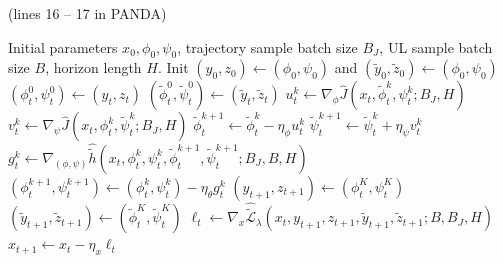 \documentclass{article}
\theoremstyle{plain}
\theoremstyle{definition}
\theoremstyle{remark}
\def\R{\mathbb R}
\def\cL{\mathcal L}
\begin{document}

 (lines 16 -- 17 in PANDA)
\begin{algorithm}[tb]
  \caption{PANDA: \underline{P}enalty-\underline{A}ugmented \underline{N}ikaido--Isoda based \underline{D}escent--\underline{A}scent}
  \label{alg: stoc-double-loop-single-large-batch-main}
  \begin{algorithmic}[1]
     Initial parameters $x_0,\phi_0,\psi_0$, trajectory sample batch size $B_{J}$, UL sample batch size $B$, horizon length $H$.
    \STATE Init $(y_0,z_0) \gets (\phi_0,\psi_0)$ and $(\tilde{y}_0,\tilde{z}_0) \gets (\phi_0,\psi_0)$ \label{line: init-policies}
        \STATE $(\phi_t^0,\psi_t^0) \gets (y_t,z_t)$ 
        \STATE $(\tilde{\phi}_t^0,\tilde{\psi}_t^0) \gets (\tilde{y}_t,\tilde{z}_t)$
        \STATE $u_t^{k} \gets  \nabla_\phi \hat{J}(x_t,\tilde{\phi}_t^k,\psi_t^k;B_{J},H) $
        \STATE $v_t^{k} \gets  \nabla_\psi \hat{J}(x_t,\phi_t^k,\tilde{\psi}_t^k;B_{J},H)$ 
        \STATE $\tilde{\phi}_t^{k+1} \gets \tilde{\phi}_t^k - \eta_\phi u_t^{k}$ 
        \STATE $\tilde{\psi}_t^{k+1} \gets \tilde{\psi}_t^k + \eta_\psi v_t^{k}$
        \STATE $g_t^k \gets \nabla_{(\phi,\psi)} \widehat{\tilde{h}}(x_t,\phi_t^k,\psi_t^k, \tilde{\phi}_t^{k+1},\tilde{\psi}_t^{k+1};B_{J},B, H)$ 
        \STATE $(\phi_t^{k+1},\psi_t^{k+1}) \gets (\phi_t^{k},\psi_t^{k}) - \eta_\theta g_t^{k} $ \label{line: penalty-subproblem-estimation-end}
        \ENDFOR
        \STATE $(y_{t+1},z_{t+1}) \gets  (\phi_t^K,\psi_t^K)$
        \STATE $(\tilde{y}_{t+1},\tilde{z}_{t+1}) \gets (\tilde{\phi}_t^K,\tilde{\psi}_t^K)$
        \STATE $\ell_t \gets \nabla_x \widehat{\tilde{\cL}}_\lambda(x_t,y_{t+1},z_{t+1},\tilde{y}_{t+1},\tilde{z}_{t+1};B, B_J,H)$
        \STATE $x_{t+1} \gets x_t - \eta_x \ell_{t}$ \label{line: hypergradient-update}
    \ENDFOR
  \end{algorithmic}
\end{algorithm}
\end{document}
